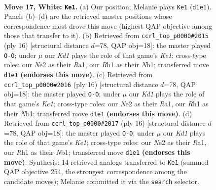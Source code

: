 \documentclass[11pt]{article}
\begin{document}
\clearpage

\begin{figure}[p]\centering
\begin{subfigure}{0.46\textwidth}\centering
\resizebox{\linewidth}{!}{%
\newchessgame
\chessboard[
  setfen={rnbqr1k1/2pn2pp/pp2p3/3pPp2/3P1P1P/6Q1/PPP1N1P1/1R1K1BNR w - - 8 17},
  showmover=false,
  pgfstyle=straightmove, color=movearrow, markmove={d1-e1}
]}
\caption{}
\end{subfigure}\hfill
\begin{subfigure}{0.46\textwidth}\centering
\resizebox{\linewidth}{!}{%
\newchessgame
\chessboard[
  setfen={rn1qk2r/pb1p1ppp/1p2pn2/2p5/2PP4/5NP1/PPQ1PPBP/RN2K2R w KQkq - 2 9},
  showmover=false,
  pgfstyle=straightmove, color=movearrow, markmove={e1-g1}
]}
\caption{}
\end{subfigure}
\\[4pt]
\begin{subfigure}{0.46\textwidth}\centering
\resizebox{\linewidth}{!}{%
\newchessgame
\chessboard[
  setfen={rn1qk2r/pb1p1ppp/1p2pn2/2p5/2PP4/5NP1/PPQ1PPBP/RN2K2R w KQkq - 2 9},
  showmover=false,
  pgfstyle=straightmove, color=movearrow, markmove={e1-g1}
]}
\caption{}
\end{subfigure}\hfill
\begin{subfigure}{0.46\textwidth}\centering
\resizebox{\linewidth}{!}{%
\newchessgame
\chessboard[
  setfen={rn1qk2r/pb1p1ppp/1p2pn2/2p5/2PP4/5NP1/PPQ1PPBP/RN2K2R w KQkq - 2 9},
  showmover=false,
  pgfstyle=straightmove, color=movearrow, markmove={e1-g1}
]}
\caption{}
\end{subfigure}
\caption{\textbf{Move 17, White: \texttt{Ke1}.} (a) Our position; Melanie plays \texttt{Ke1} (\texttt{d1e1}). Panels (b)--(d) are the retrieved master positions whose correspondence most drove this move (highest QAP objective among those that transfer to it). (b) Retrieved from \texttt{ccrl\_top\_p0000\#2015} (ply 16) [structural distance $d$=78, QAP obj=18]: the master played \texttt{O-O}; under $\mu$ our \emph{Kd1} plays the role of that game's \emph{Ke1}; cross-type roles: our \emph{N}e2 as their \emph{R}a1, our \emph{R}h1 as their \emph{N}b1; transferred move \texttt{d1e1} \textbf{(endorses this move)}. (c) Retrieved from \texttt{ccrl\_top\_p0000\#2016} (ply 16) [structural distance $d$=78, QAP obj=18]: the master played \texttt{O-O}; under $\mu$ our \emph{Kd1} plays the role of that game's \emph{Ke1}; cross-type roles: our \emph{N}e2 as their \emph{R}a1, our \emph{R}h1 as their \emph{N}b1; transferred move \texttt{d1e1} \textbf{(endorses this move)}. (d) Retrieved from \texttt{ccrl\_top\_p0000\#2017} (ply 16) [structural distance $d$=78, QAP obj=18]: the master played \texttt{O-O}; under $\mu$ our \emph{Kd1} plays the role of that game's \emph{Ke1}; cross-type roles: our \emph{N}e2 as their \emph{R}a1, our \emph{R}h1 as their \emph{N}b1; transferred move \texttt{d1e1} \textbf{(endorses this move)}. Synthesis: 14 retrieved analogs transferred to \texttt{Ke1} (summed QAP objective 254, the strongest correspondence among the candidate moves); Melanie committed it via the \texttt{search} selector.}
\label{fig:thought-m32}
\end{figure}
\end{document}
